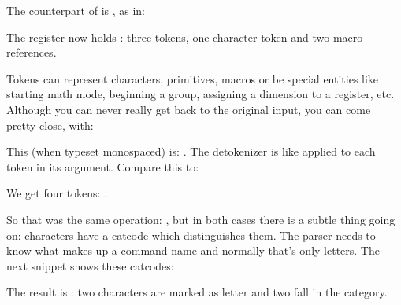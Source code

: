 The counterpart of \type {\normalexpanded} is \type {\normalunexpanded}, as in:

\startbuffer
\def\MyMacroA{a}
\def\MyMacroB{b}
\normalprotected{}
\normalexpanded {\scratchtoks
    {\MyMacroA\normalunexpanded {\MyMacroB}\MyMacroC}}
\stopbuffer

\typebuffer[option=TEX] \getbuffer

The register now holds \MyShow: three tokens, one character token and two
macro references.

Tokens can represent characters, primitives, macros or be special entities like
starting math mode, beginning a group, assigning a dimension to a register, etc.
Although you can never really get back to the original input, you can come pretty
close, with:

\startbuffer
{}
\stopbuffer

\typebuffer[option=TEX]

This (when typeset monospaced) is: {\tt \inlinebuffer}. The detokenizer is like
\type {\string} applied to each token in its argument. Compare this to:

\startbuffer
\normalexpanded {
    \normaldetokenize{10pt}
}
\stopbuffer

\typebuffer[option=TEX]

We get four tokens: {\tt\inlinebuffer}.

\startbuffer
{}
\stopbuffer

\typebuffer[option=TEX]

So that was the same operation: {\tt\inlinebuffer}, but in both cases there is a
subtle thing going on: characters have a catcode which distinguishes them. The
parser needs to know what makes up a command name and normally that's only
letters. The next snippet shows these catcodes:

\startbuffer
{}
\stopbuffer

\typebuffer[option=TEX]

The result is \quotation {\tt\inlinebuffer}: two characters are marked as \quote
{letter} and two fall in the  category.

\stopsection

\startsection[title={\LUATEX\ primitives}]

